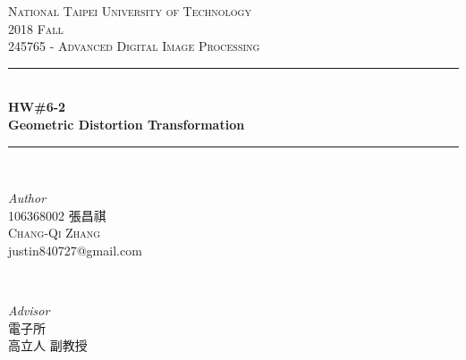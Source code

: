 \begin{titlepage} %
	\newcommand{\HRule}{\rule{\linewidth}{0.5mm}} %
		
	\center %
		
		
	\textsc{\LARGE National Taipei University of Technology}\\[1.5cm] %
		
	\textsc{\Large 2018 Fall}\\[0.5cm] %
		
	\textsc{\large 245765 - Advanced Digital Image Processing}\\[0.5cm] %
		
		
	\HRule\\[0.4cm]
		
	{\huge\bfseries HW\#6-2\\\vspace{1em} Geometric Distortion Transformation}\\[0.4cm] %
		
	\HRule\\[1.5cm]
		
	\begin{CJK}{UTF8}{bsmi}
		\begin{minipage}{0.4\textwidth}
			\begin{flushleft}
				\large
				\textit{Author}\\
				106368002 張昌祺\\ 
				\textsc{Chang-Qi Zhang} \\
				justin840727@gmail.com %
			\end{flushleft}
		\end{minipage}
		~
		\begin{minipage}{0.4\textwidth}
			\begin{flushright}
				\large
				\textit{Advisor}\\
				電子所 \\
				高立人 副教授 %
			\end{flushright}
		\end{minipage}
	\end{CJK}
		

\end{titlepage}
